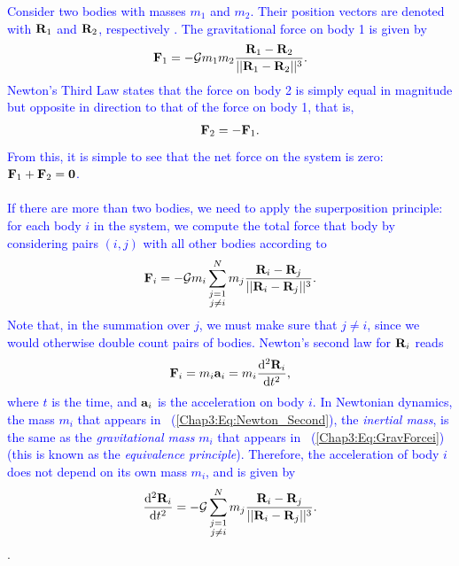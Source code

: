 \documentclass[main.tex]{subfiles}
\begin{document}
\begin{tcolorbox}[sharp corners, colback=blue!30, colframe=blue!80!blue, title=Orbital Dynamics Ib]
\par \textcolor{blue}{Consider two bodies with masses $m_1$ and $m_2$. Their position vectors are denoted with ${\mathbf{R}}_1$ and ${\mathbf{R}}_2$, respectively . The gravitational force on body 1 is given by
\begin{align}
\label{Chap3:Eq:F_1_vec}
{\mathbf{F}}_{1} = - \mathcal{G} m_1m_2 \frac{{\mathbf{R}}_1 - {\mathbf{R}}_2}{|| {\mathbf{R}}_1 - {\mathbf{R}}_2||^3}.
\end{align}
 Newton's Third Law states that the force on body 2 is simply equal in magnitude but opposite in direction to that of the force on body 1, that is,
\begin{align}
{\mathbf{F}}_{2} = - {\mathbf{F}}_{1}.
\end{align}
From this, it is simple to see that the net force on the system is zero: ${\mathbf{F}}_1 + {\mathbf{F}}_2 = {\mathbf{0}}$. \\ \\
If there are more than two bodies, we need to apply the superposition principle: for each body $i$ in the system, we compute the total force that body by considering pairs $(i,j)$ with all other bodies according to
\begin{align}
\label{Chap3:Eq:GravForcei}
{\mathbf{F}}_i = -\mathcal{G} m_i \sum_{\substack{j=1 \\ j\neq i}}^{N} m_j \frac{ {\mathbf{R}}_i - {\mathbf{R}}_j}{|| {\mathbf{R}}_i - {\mathbf{R}}_j||^3}.
\end{align}
Note that, in the summation over $j$, we must make sure that $j\neq i$, since we would otherwise double count pairs of bodies. Newton's second law for ${\mathbf{R}}_i$ reads
\begin{align}
\label{Chap3:Eq:Newton_Second}
{\mathbf{F}}_i = m_i {\mathbf{a}}_i = m_i \frac{\mathrm{d}^2 {\mathbf{R}}_i}{\mathrm{d} t^2},
\end{align}
where $t$ is the time, and ${\mathbf{a}}_i$ is the acceleration on body $i$. In Newtonian dynamics, the mass $m_i$ that appears in \Eq~(\ref{Chap3:Eq:Newton_Second}), the {\it inertial mass}, is the same as the {\it gravitational mass} $m_i$ that appears in \Eq~(\ref{Chap3:Eq:GravForcei}) (this is known as the {\it equivalence principle}). Therefore, the acceleration of body $i$ does not depend on its own mass $m_i$, and is given by
\begin{align}
\label{Chap3:Eq:EOM}
\frac{\mathrm{d}^2 {\mathbf{R}}_i}{\mathrm{d} t^2} = - \mathcal{G} \sum_{\substack{j=1 \\ j\neq i}}^{N} m_j \frac{ {\mathbf{R}}_i - {\mathbf{R}}_j}{|| {\mathbf{R}}_i - {\mathbf{R}}_j||^3}.
\end{align}
}.  
\end{tcolorbox}
\end{document}
